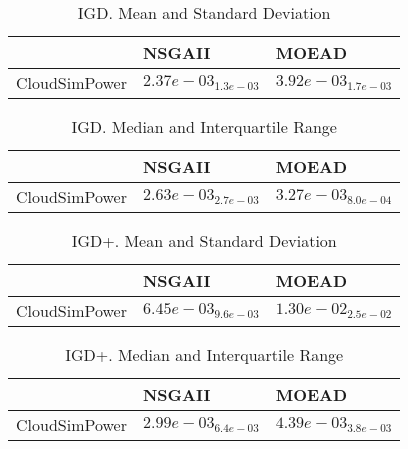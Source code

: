 \documentclass{article}
\begin{document}
\begin{table}
\caption{IGD. Mean and Standard Deviation}
\label{table: IGD}
\centering
\begin{scriptsize}
\begin{tabular}{lll}
\hline & NSGAII &  MOEAD\\
\hline 
CloudSimPower & \cellcolor{gray95}$  2.37e-03_{ 1.3e-03}$ & \cellcolor{gray25}$  3.92e-03_{ 1.7e-03}$ \\
\hline
\end{tabular}
\end{scriptsize}
\end{table}

\begin{table}
\caption{IGD. Median and Interquartile Range}
\label{table: IGD}
\centering
\begin{scriptsize}
\begin{tabular}{lll}
\hline & NSGAII &  MOEAD\\
\hline 
CloudSimPower & \cellcolor{gray95}$  2.63e-03_{ 2.7e-03}$ & \cellcolor{gray25}$  3.27e-03_{ 8.0e-04}$ \\
\hline
\end{tabular}
\end{scriptsize}
\end{table}

\begin{table}
\caption{IGD+. Mean and Standard Deviation}
\label{table: IGD+}
\centering
\begin{scriptsize}
\begin{tabular}{lll}
\hline & NSGAII &  MOEAD\\
\hline 
CloudSimPower & \cellcolor{gray95}$  6.45e-03_{ 9.6e-03}$ & \cellcolor{gray25}$  1.30e-02_{ 2.5e-02}$ \\
\hline
\end{tabular}
\end{scriptsize}
\end{table}

\begin{table}
\caption{IGD+. Median and Interquartile Range}
\label{table: IGD+}
\centering
\begin{scriptsize}
\begin{tabular}{lll}
\hline & NSGAII &  MOEAD\\
\hline 
CloudSimPower & \cellcolor{gray95}$  2.99e-03_{ 6.4e-03}$ & \cellcolor{gray25}$  4.39e-03_{ 3.8e-03}$ \\
\hline
\end{tabular}
\end{scriptsize}
\end{table}
\end{document}
